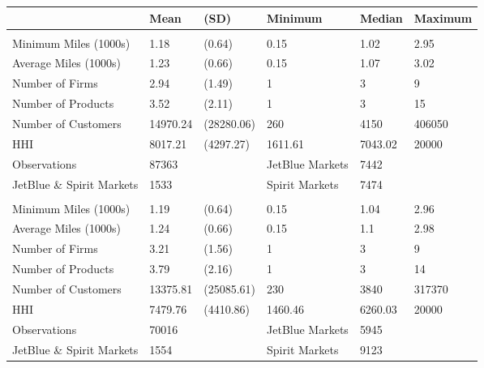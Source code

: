 
\begin{tabular}[t]{llllll}
\toprule
 & Mean & (SD) & Minimum & Median & Maximum\\
\midrule
\addlinespace[0.3em]
\multicolumn{6}{l}{\textbf{Pre-Pandemic}}\\
\hspace{1em}Minimum Miles (1000s) & 1.18 & (0.64) & 0.15 & 1.02 & 2.95\\
\hspace{1em}Average Miles (1000s) & 1.23 & (0.66) & 0.15 & 1.07 & 3.02\\
\hspace{1em}Number of Firms & 2.94 & (1.49) & 1 & 3 & 9\\
\hspace{1em}Number of Products & 3.52 & (2.11) & 1 & 3 & 15\\
\hspace{1em}Number of Customers & 14970.24 & (28280.06) & 260 & 4150 & 406050\\
\hspace{1em}HHI & 8017.21 & (4297.27) & 1611.61 & 7043.02 & 20000\\
\midrule
\hspace{1em}Observations & 87363 &  & JetBlue Markets & 7442 & \\
\hspace{1em}JetBlue \& Spirit Markets & 1533 &  & Spirit Markets & 7474 & \\
\midrule
\addlinespace[0.3em]
\multicolumn{6}{l}{\textbf{Post-Pandemic}}\\
\hspace{1em}Minimum Miles (1000s) & 1.19 & (0.64) & 0.15 & 1.04 & 2.96\\
\hspace{1em}Average Miles (1000s) & 1.24 & (0.66) & 0.15 & 1.1 & 2.98\\
\hspace{1em}Number of Firms & 3.21 & (1.56) & 1 & 3 & 9\\
\hspace{1em}Number of Products & 3.79 & (2.16) & 1 & 3 & 14\\
\hspace{1em}Number of Customers & 13375.81 & (25085.61) & 230 & 3840 & 317370\\
\hspace{1em}HHI & 7479.76 & (4410.86) & 1460.46 & 6260.03 & 20000\\
\midrule
\hspace{1em}Observations & 70016 &  & JetBlue Markets & 5945 & \\
\hspace{1em}JetBlue \& Spirit Markets & 1554 &  & Spirit Markets & 9123 & \\
\bottomrule
\end{tabular}
